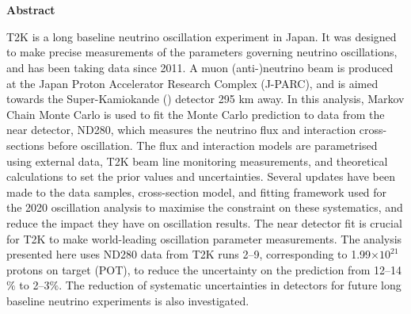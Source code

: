 \chapter{}

\begin{center}
\textbf{Abstract} 
\newline
\end{center}

T2K is a long baseline neutrino oscillation experiment in Japan. It was designed to make precise measurements of the parameters governing neutrino oscillations, and has been taking data since 2011. A muon (anti-)neutrino beam is produced at the Japan Proton Accelerator Research Complex (J-PARC), and is aimed towards the Super-Kamiokande (\SK) detector 295 km away. In this analysis, Markov Chain Monte Carlo is used to fit the Monte Carlo prediction to data from the near detector, ND280, which measures the neutrino flux and interaction cross-sections before oscillation. The flux and interaction models are parametrised using external data, T2K beam line monitoring measurements, and theoretical calculations to set the prior values and uncertainties. Several updates have been made to the data samples, cross-section model, and fitting framework used for the 2020 oscillation analysis to maximise the constraint on these systematics, and reduce the impact they have on oscillation results. The near detector fit is crucial for T2K to make world-leading oscillation parameter measurements. The analysis presented here uses ND280 data from T2K runs 2--9, corresponding to 1.99$\times10^{21}$ protons on target (POT), to reduce the uncertainty on the \SK prediction from 12--14$\%$ to 2--3$\%$. The reduction of systematic uncertainties in detectors for future long baseline neutrino experiments is also investigated. 


\newpage
